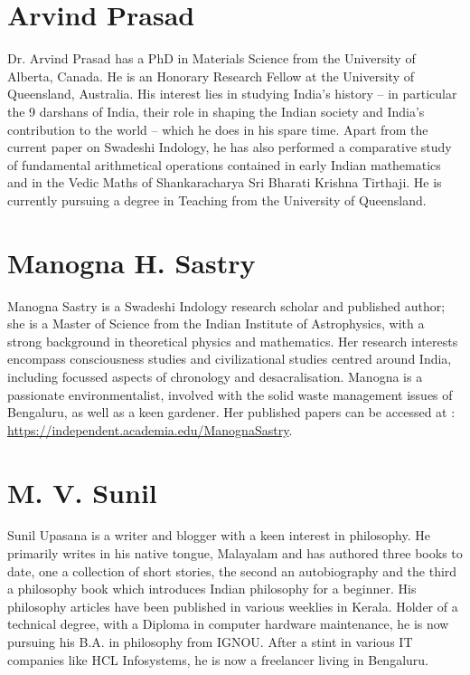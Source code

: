 \section*{Arvind Prasad}

Dr. Arvind Prasad has a PhD in Materials Science from the University of Alberta, Canada. He is an Honorary Research Fellow at the University of Queensland, Australia. His interest lies in studying India’s history – in particular the 9 darshans of India, their role in shaping the Indian society and India’s contribution to the world – which he does in his spare time. Apart from the current paper on Swadeshi Indology, he has also performed a comparative study of fundamental arithmetical operations contained in early Indian mathematics and in the Vedic Maths of Shankaracharya Sri Bharati Krishna Tirthaji. He is currently pursuing a degree in Teaching from the University of Queensland.


\section*{Manogna H. Sastry}

Manogna Sastry is a Swadeshi Indology research scholar and published author; she is a Master of Science from the Indian Institute of Astrophysics, with a strong background in theoretical physics and mathematics. Her research interests encompass consciousness studies and civilizational studies centred around India, including focussed aspects of chronology and desacralisation. Manogna is a passionate environmentalist, involved with the solid waste management issues of Bengaluru, as well as a keen gardener. Her published papers can be accessed at : \url{https://independent.academia.edu/ManognaSastry}.


\section*{M. V. Sunil}

Sunil Upasana is a writer and blogger with a keen interest in philosophy. He primarily writes in his native tongue, Malayalam and has authored three books to date, one a collection of short stories, the second an autobiography and the third a philosophy book which introduces Indian philosophy for a beginner. His philosophy articles have been published in various weeklies in Kerala. Holder of a technical degree, with a Diploma in computer hardware maintenance, he is now pursuing his B.A. in philosophy from IGNOU. After a stint in various IT companies like HCL Infosystems, he is now a freelancer living in Bengaluru.


